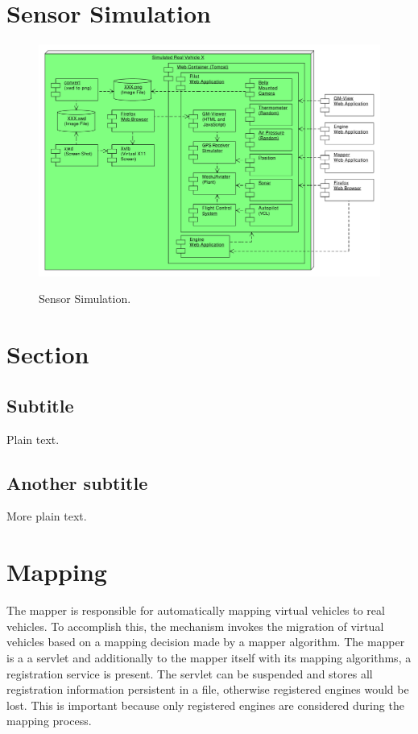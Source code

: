 \section{Sensor Simulation}

\begin{figure}[h]
	\begin{center}
		{\includegraphics[width=11.6cm]{SensorSimulation-3.pdf}}
	\end{center}
	\caption{Sensor Simulation.\label{fig:SensorSimulation}}
\end{figure}


\section{Section}

\subsection{Subtitle}

Plain text.

\subsection{Another subtitle}

More plain text.


\section{Mapping}
The mapper is responsible for automatically mapping virtual vehicles to real vehicles. To accomplish this, the mechanism invokes 
the migration of virtual vehicles based on a mapping decision made by a mapper algorithm. The mapper is a a servlet and additionally 
to the mapper itself with its mapping algorithms, a registration service is present. The servlet can be suspended and stores all
registration information persistent in a file, otherwise registered engines would be lost. This is important because only registered 
engines are considered during the mapping process.

